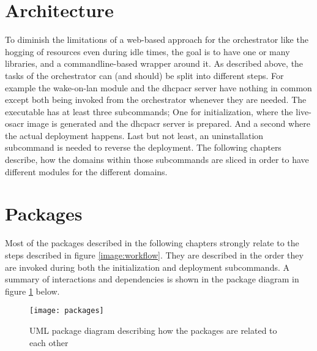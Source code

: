 \section{Architecture}
To diminish the limitations of a web-based approach for the orchestrator like the hogging of resources even during idle times, the goal is to have one or many libraries, and a commandline-based wrapper around it.
\newline
As described above, the tasks of the orchestrator can (and should) be split into different steps. For example the wake-on-lan module and the \gls{dhcpacr} server have nothing in common except both being invoked from the orchestrator whenever they are needed.
\newline
The executable has at least three subcommands; One for initialization, where the live-\gls{osacr} image is generated and the \gls{dhcpacr} server is prepared. And a second where the actual deployment happens. Last but not least, an uninstallation subcommand is needed to reverse the deployment.
\newline
The following chapters describe, how the domains within those subcommands are sliced in order to have different modules for the different domains.

\section{Packages}
Most of the packages described in the following chapters strongly relate to the steps described in figure \ref{image:workflow}. They are described in the order they are invoked during both the initialization and deployment subcommands. A summary of interactions and dependencies is shown in the package diagram in figure \ref{image:packages} below.

\begin{figure}[H]
  \texttt{[image: packages]}
  \centering
  \caption{UML package diagram describing how the packages are related to each other}
  \label{image:packages}
\end{figure}

